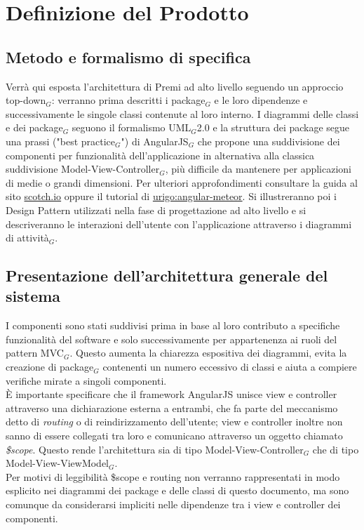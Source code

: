 \newpage
\section{Definizione del Prodotto}

\subsection{Metodo e formalismo di specifica}
Verrà qui esposta l'architettura di Premi ad alto livello seguendo un approccio top-down$_G$: verranno prima descritti i package$_G$ e le loro dipendenze e successivamente le singole classi contenute al loro interno. I diagrammi delle classi e dei package$_G$ seguono il formalismo UML$_G$2.0 e la struttura dei package segue una prassi ("best practice$_G$") di AngularJS$_G$ che propone una suddivisione dei componenti per funzionalità dell'applicazione in alternativa alla classica suddivisione Model-View-Controller$_G$, più difficile da mantenere per applicazioni di medie o grandi dimensioni. Per ulteriori approfondimenti consultare la guida al sito \href{https://scotch.io/tutorials/angularjs-best-practices-directory-structure}{scotch.io} oppure il tutorial di \href{http://angular-meteor.com/tutorial/step_07}{urigo:angular-meteor}.
Si illustreranno poi i Design Pattern utilizzati nella fase di progettazione ad alto livello e si descriveranno le interazioni dell'utente con l'applicazione attraverso i diagrammi di attività$_G$.


\subsection{Presentazione dell'architettura generale del sistema}

I componenti sono stati suddivisi prima in base al loro contributo a specifiche funzionalità del software e solo successivamente per appartenenza ai ruoli del pattern MVC$_G$. Questo aumenta la chiarezza espositiva dei diagrammi, evita la creazione di package$_G$ contenenti un numero eccessivo di classi e aiuta a compiere verifiche mirate a singoli componenti. \\
È importante specificare che il framework AngularJS unisce view e controller attraverso una dichiarazione esterna a entrambi, che fa parte del meccanismo detto di \textit{routing} o di reindirizzamento dell'utente; view e controller inoltre non sanno di essere collegati tra loro e comunicano attraverso un oggetto chiamato \textit{\$scope}. Questo rende l'architettura sia di tipo Model-View-Controller$_G$ che di tipo Model-View-ViewModel$_G$. \\
Per motivi di leggibilità \$scope e routing non verranno rappresentati in modo esplicito nei diagrammi dei package e delle classi di questo documento, ma sono comunque da considerarsi impliciti nelle dipendenze tra i view e controller dei componenti.

